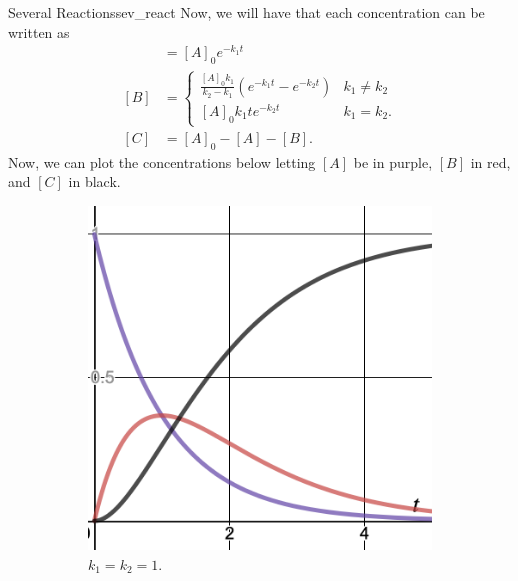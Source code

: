 \begin{ex}{Several Reactions}{sev_react}
        Now, we will have that each concentration can be written as
        \begin{align*}
            [A]&=[A]_0e^{-k_1t}\\
            [B]&=\begin{cases}
        \frac{[A]_0k_1}{k_2-k_1}\left( e^{-k_1t}-e^{-k_2t}\right) & k_1\neq k_2\\
        [A]_0k_1te^{-k_2t} & k_1=k_2.
        \end{cases}\\
        [C]&=[A]_0-[A]-[B].
        \end{align*}
        Now, we can plot the concentrations below letting $[A]$ be in purple, $[B]$ in red, and $[C]$ in black.
        \begin{figure}[H]
    \centering
    \begin{subfigure}[h]{0.3\textwidth}
        \includegraphics[width=\textwidth]{Figures_Part_2/k1=k2.png}
        \caption{$k_1=k_2=1$.}
    \end{subfigure}
    ~ 
    \begin{subfigure}[h]{0.3\textwidth}

\end{subfigure}
\end{figure}
\end{ex}
